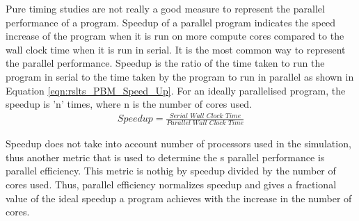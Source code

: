 \documentclass[preprint,11pt,authoryear]{elsarticle}
\begin{document}
Pure timing studies are not really a good measure to represent the parallel performance of a program. 
Speedup of a parallel program indicates the speed increase of the program when it is run on more 
compute cores compared to the wall clock time when it is run in serial. It is the most common way to 
represent the parallel performance. Speedup is the ratio of the time taken to run the program in serial 
to the time taken by the program to run in parallel as shown in Equation \ref{eqn:rslts_PBM_Speed_Up}. 
For an ideally parallelised program, the speedup is 'n' times, where n is the number of cores used.\\

\begin{align}
\textit{Speedup} = \frac{\textit{Serial Wall Clock Time}}{\textit{Parallel Wall Clock Time}}
\label{eqn:rslts_PBM_Speed_Up}
\end{align}

Speedup does not take into account number of processors used in the simulation, thus another metric 
that is used to determine the s parallel performance is parallel efficiency. This metric is nothig by 
speedup divided by the number of cores used. Thus, parallel efficiency normalizes speedup and gives 
a fractional value of the ideal speedup a program achieves with the increase in the number of cores.\\
\end{document}
